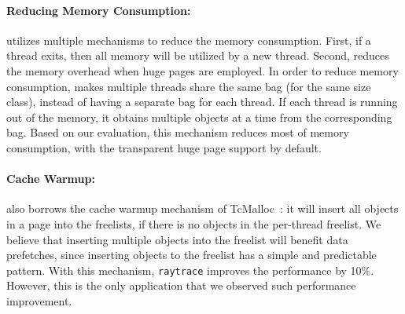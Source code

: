 \paragraph{Reducing Memory Consumption:} \NM{} utilizes multiple mechanisms to reduce the memory consumption. First, if a thread exits, then all memory will be utilized by a new thread. Second, \NM{} reduces the memory overhead when huge pages are employed.  In order to reduce memory consumption, \NM{} makes multiple threads share the same bag (for the same size class), instead of having a separate bag for each thread. If each thread is running out of the memory, it obtains multiple objects at a time from the corresponding bag. Based on our evaluation, this mechanism  reduces most of memory consumption, with the transparent huge page support by default.  




\paragraph{Cache Warmup:} \NM{} also borrows the cache warmup mechanism of TcMalloc~\cite{tcmalloc}: it will insert all objects in a page into the freelists, if there is no objects in the per-thread freelist. We believe that inserting multiple objects into the freelist will benefit data prefetches, since inserting objects to the freelist has a simple and predictable pattern. With this mechanism, \texttt{raytrace} improves the performance by 10\%. However, this is the only application that we observed such performance improvement. 

